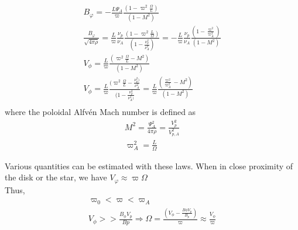 \documentclass[10pt,a4paper,english]{article}
\begin{document}
\begin{align}
   B_{\varphi} = - \frac{L\Psi_{A}}{\varpi} \frac{(1-\varpi^{2} \frac{\Omega}{L})}{(1-M^{2})} \\
  \frac{B_{\varphi}}{\sqrt{4\pi\rho}} = \frac{L}{\varpi}\frac{\nu_{p}}{\nu_{A}}\frac{(1-\varpi^{2}\frac{L}{\Omega})}{(1-\frac{\nu^{2}_{p}}{\nu^{2}_{A}})} = - \frac{L}{\varpi} \frac{\nu_{p}}{\nu_{A}}\frac{(1-\frac{\varpi^{2}}{\varpi^{2}_{A}})}{(1-M^{2})} \\
  V_{\phi} = \frac{L}{\varpi} \frac{(\varpi^{2}\frac{\Omega}{L}-M^{2})}{(1-M^{2})} \\
  V_{\phi} = \frac{L}{\varpi} \frac{(\varpi^{2}\frac{\Omega}{L}-\frac{\nu^{2}_{p})}{\nu^{2}_{A}}}{(1-{\frac{\nu^{2}_{p}}{\nu^{2}_{A})}}} = \frac{L}{\varpi} \frac{(\frac{\varpi^{2}}{\varpi^{2}_{A}}-M^{2})}{(1-M^{2})} \\ 
\end{align}
where the poloidal Alfvén Mach number is defined as
\begin{align*}
   M^{2} = \frac{\Psi^{2}_{A}}{4\pi\rho} = \frac{V^{2}_{p}}{V^{2}_{p,A}} \\
   \varpi^{2}_{A} = \frac{L}{\Omega}
\end{align*}

Various quantities can be estimated with these laws. When in close proximity of the disk or the star, we have $V_{\varphi} \approx \varpi \Omega$
\\
Thus,
\begin{align*}
   \varpi_{0} < \varpi < \varpi_{A} \\
   V_{\phi} >> \frac{B_{\phi}V_{p}}{B{p}}  \Rightarrow  \Omega = \frac{(V_{\phi}-\frac{B{\phi}V_{p}}{B_{p}})}{\varpi} \approx \frac{V_{\phi}}{\varpi}
\end{align*}
\end{document}
